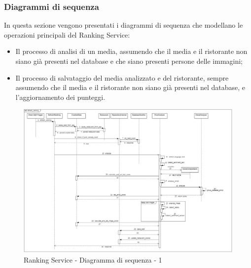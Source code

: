 \subsubsection{Diagrammi di sequenza}
In questa sezione vengono presentati i diagrammi di sequenza che modellano le operazioni principali del Ranking Service:
\begin{itemize}
	\item Il processo di analisi di un media, assumendo che il media e il ristorante non siano già presenti nel database e che siano presenti persone delle immagini;
	\item Il processo di salvataggio del media analizzato e del ristorante, sempre assumendo che il media e il ristorante non siano già presenti nel database, e l'aggiornamento dei punteggi.
\end{itemize}
\begin{figure}[H]
    \centerfloat
    \includegraphics[scale=0.45]{Contenuto/Immagini/seq1-RS.JPG}
    \caption{Ranking Service - Diagramma di sequenza - 1}
\end{figure}
